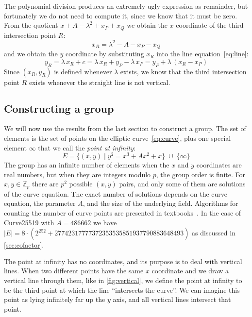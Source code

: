 \documentclass{article}
\begin{document}
The polynomial division produces an extremely ugly expression as remainder, but fortunately we do not need to compute it, since we know that it must be zero.
From the quotient $x + A - \lambda^2 + x_P + x_Q$ we obtain the $x$ coordinate of the third intersection point $R$:
\begin{equation}
x_R = \lambda^2 - A - x_P - x_Q \label{eq:xR}
\end{equation}
and we obtain the $y$ coordinate by substituting $x_R$ into the line equation~\eqref{eq:line}:
\begin{equation}
y_R = \lambda\,x_R + c = \lambda\,x_R + y_P - \lambda\,x_P = y_P + \lambda\,(x_R - x_P) \label{eq:yR}
\end{equation}
Since $(x_R, y_R)$ is defined whenever $\lambda$ exists, we know that the third intersection point $R$ exists whenever the straight line is not vertical.

\subsection{Constructing a group}\label{sec:group-construction}

We will now use the results from the last section to construct a group.
The set of elements is the set of points on the elliptic curve~\eqref{eq:curve}, plus one special element $\infty$ that we call the \emph{point at infinity}:
\begin{equation}
E = \{(x,y) \mid y^2 = x^3 + A x^2 + x\} \;\cup\; \{\infty\}
\end{equation}
The group has an infinite number of elements when the $x$ and $y$ coordinates are real numbers, but when they are integers modulo $p$, the group order is finite.
For $x, y \in \mathbb{Z}_p$ there are $p^2$ possible $(x, y)$ pairs, and only some of them are solutions of the curve equation.
The exact number of solutions depends on the curve equation, the parameter $A$, and the size of the underlying field.
Algorithms for counting the number of curve points are presented in textbooks~\cite{Blake:1999,Cohen:2006}.
In the case of Curve25519 with $A = 486662$ we have $|E| = 8 \cdot (2^{252} + 27742317777372353535851937790883648493)$ as discussed in \autoref{sec:cofactor}.

The point at infinity has no coordinates, and its purpose is to deal with vertical lines.
When two different points have the same $x$ coordinate and we draw a vertical line through them, like in \autoref{fig:vertical}, we define the point at infinity to be the third point at which the line ``intersects the curve''.
We can imagine this point as lying infinitely far up the $y$ axis, and all vertical lines intersect that point.
\end{document}
